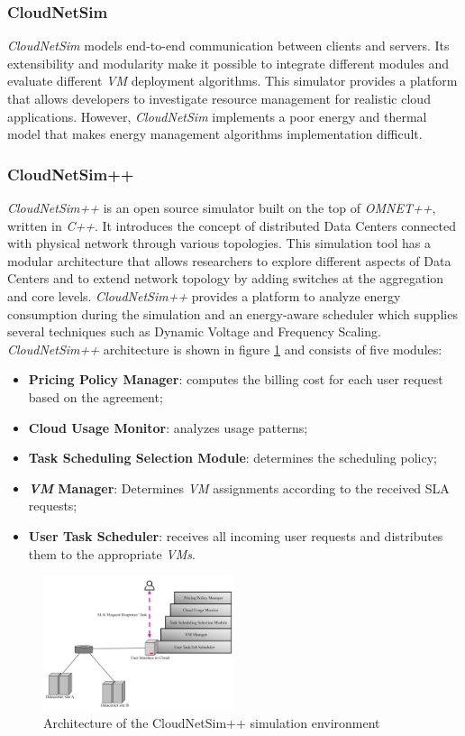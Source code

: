 {\subsubsection*{CloudNetSim}
\emph{CloudNetSim} \cite{cucinotta2013cloudnetsim} models end-to-end communication between clients and servers. Its extensibility and modularity make it possible to integrate different modules and evaluate different \emph{VM} deployment algorithms. This simulator provides a platform that allows developers to investigate resource management for realistic cloud applications. However, \emph{CloudNetSim} implements a poor energy and thermal model that makes energy management algorithms implementation difficult. \cite{mansouri2020cloud}
\subsubsection{CloudNetSim++}
\emph{CloudNetSim++} \cite{malik2014cloudnetsim++} is an open source simulator built on the top of \emph{OMNET++}, written in \emph{C++}. It introduces the concept of distributed Data Centers connected with physical network through various topologies. This simulation tool has a modular architecture that allows researchers to explore different aspects of Data Centers and to extend network topology by adding switches at the aggregation and core levels. \emph{CloudNetSim++} provides a platform to analyze energy consumption during the simulation and an energy-aware scheduler which supplies several techniques such as Dynamic Voltage and Frequency Scaling. 
\emph{CloudNetSim++} architecture is shown in figure \ref{fig:cloudnetsim++_arch} and consists of five modules:
\begin{itemize}
    \item \textbf{Pricing Policy Manager}: computes the billing cost for each user request based on the agreement;
    \item \textbf{Cloud Usage Monitor}: analyzes usage patterns;
    \item \textbf{Task Scheduling Selection Module}: determines the scheduling policy;
    \item \textbf{\emph{VM} Manager}: Determines \emph{VM} assignments according to the received SLA requests;
    \item \textbf{User Task Scheduler}: receives all incoming user requests and distributes them to the appropriate \emph{VMs}.
\end{itemize}
\begin{figure}[h]
    \centering
    \includegraphics[width=0.5\textwidth]{chapters/images/cloudnetsim++_arch.png}
    \caption{Architecture of the CloudNetSim++ simulation environment}
    \label{fig:cloudnetsim++_arch}
\end{figure}
}
